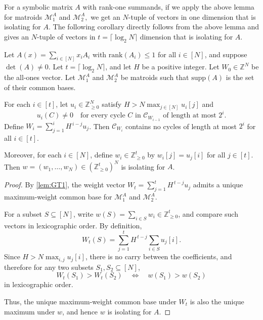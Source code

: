 \documentclass[11pt]{article}
\newcommand{\rank}{\mathrm{rank}}
\newcommand{\Z}{\mathbb{Z}}
\newcommand{\supp}{\mathrm{supp}}
\begin{document}
For a symbolic matrix $A$ with rank-one summands, if we apply the above lemma for matroids $\mathcal{M}^A_1$ and $\mathcal{M}^A_2,$ we get an $N$-tuple of vectors in one dimension that is isolating for $A$. The following corollary directly follows from the above lemma and gives an $N$-tuple of vectors in $t=\lceil \log_2 N\rceil$ dimension that is isolating for $A$.

\begin{corollary}\label{cor:GTA}
Let $A(x)=\sum_{i\in [N]} x_i A_i$ with $\rank(A_i)\le 1$ for all $i\in[N]$, and suppose $\det(A)\neq 0$. 
Let $t=\lceil \log_2 N\rceil$, and let $H$ be a positive integer. 
Let $W_0\in \Z^N$ be the all-ones vector. 
Let $\mathcal{M}^A_1$ and $\mathcal{M}^A_2$ be matroids such that $\supp(A)$ is the set of their common bases.

For each $i\in [t]$, let $u_i\in \Z_{\geq 0}^N$ satisfy $H > N \max_{j\in [N]} u_i[j]$ and
\[
u_i(C)\neq 0 \quad \text{for every cycle $C$ in $\mathcal{C}_{W_{i-1}}$ of length at most $2^i$.}
\]
Define $W_i = \sum_{j=1}^i H^{\,i-j} u_j$.
Then $\mathcal{C}_{W_i}$ contains no cycles of length at most $2^i$ for all $i\in[t]$.

Moreover, for each $i\in [N]$, define $w_i\in \Z_{\geq 0}^t$ by $w_i[j]=u_j[i]$ for all $j\in[t]$. Then $w=(w_1,\dots,w_N)\in (\Z_{\geq 0}^t)^N$ is isolating for $A$.
\end{corollary}

\begin{proof}
By \cref{lem:GT1}, the weight vector $W_t = \sum_{j=1}^t H^{\,t-j} u_j$ admits a unique maximum-weight common base for $\mathcal{M}^A_1$ and $\mathcal{M}^A_2$.

For a subset $S\subseteq [N]$, write $w(S) = \sum_{i\in S} w_i \in \Z_{\geq 0}^t$, and compare such vectors in lexicographic order. By definition,
\[
W_t(S) = \sum_{j=1}^t H^{\,t-j} \sum_{i\in S} u_j[i].
\]
Since $H > N \max_{i,j} u_j[i]$, there is no carry between the coefficients, and therefore for any two subsets $S_1,S_2\subseteq [N]$,
\[
W_t(S_1) > W_t(S_2)
\quad \Longleftrightarrow \quad
w(S_1) > w(S_2)
\]
in lexicographic order.

Thus, the unique maximum-weight common base under $W_t$ is also the unique maximum under $w$, and hence $w$ is isolating for $A$.
\end{proof}
\end{document}
